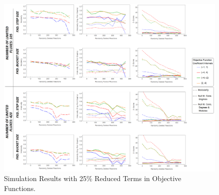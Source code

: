 \begin{landscape}
	\begin{figure}[ht]
		\centering
		\vspace*{-1.5cm}
		\includegraphics[width=1.05\hsize]{../images/supplements-obj_func_terms_reduced25-simulation-results.png}
		\caption{Simulation Results with 25\% Reduced Terms in Objective Functions.}
		\label{figure-supplements-obj_func-terms-reduced25}
	\end{figure}
\end{landscape}
